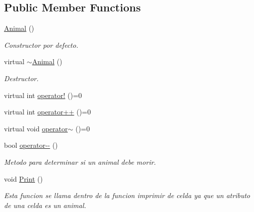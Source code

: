 \subsection*{Public Member Functions}
\begin{DoxyCompactItemize}
\item 
\hyperlink{classAnimal_a1e726a49ec952443190ac62dad22353c}{Animal} ()
\begin{DoxyCompactList}\small\item\em Constructor por defecto. \end{DoxyCompactList}\item 
virtual \hyperlink{classAnimal_a476af25adde5f0dfa688129c8f86fa5c}{$\sim$\+Animal} ()
\begin{DoxyCompactList}\small\item\em Destructor. \end{DoxyCompactList}\item 
virtual int \hyperlink{classAnimal_abe502d1333df77d245d74cd20190a0aa}{operator!} ()=0
\item 
virtual int \hyperlink{classAnimal_a66e3bc83959ea5c5d7aa8d85f8ca993c}{operator++} ()=0
\item 
virtual void \hyperlink{classAnimal_a6539ec18d8975982b65de76d8e5638f0}{operator$\sim$} ()=0
\item 
bool \hyperlink{classAnimal_a7c407c852d55806aa10b2db5844f683d}{operator-\/-\/} ()
\begin{DoxyCompactList}\small\item\em Metodo para determinar si un animal debe morir. \end{DoxyCompactList}\item 
void \hyperlink{classAnimal_aa03d8b2c76ee132f3347e7c1323d1473}{Print} ()
\begin{DoxyCompactList}\small\item\em Esta funcion se llama dentro de la funcion imprimir de celda ya que un atributo de una celda es un animal. \end{DoxyCompactList}\end{DoxyCompactItemize}
